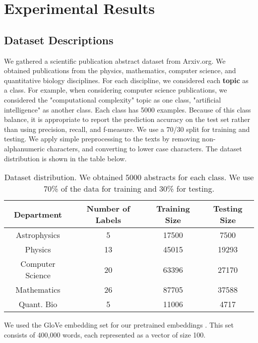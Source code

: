 
\chapter{Experimental Results} \label{Results}

\section{Dataset Descriptions}

We gathered a scientific publication abstract dataset from Arxiv.org. We obtained
publications from the physics, mathematics, computer science, and quantitative biology disciplines.
For each discipline, we considered each \textbf{topic} as a
class. For example, when considering computer science publications, we considered the
"computational complexity" topic as one class, "artificial intelligence" as another class. Each class has 5000 examples. Because of this class balance, it is appropriate to
report the prediction accuracy on the test set rather than using precision, recall, and f-measure. We use a 70/30 split for training and testing. We apply simple preprocessing to the texts by removing non-alphanumeric
characters, and converting to lower case characters. The dataset distribution is shown in the table below.

\begin{center}
  \begin{table}\begin{tabular}{||c c c c||}
 \hline
 Department & Number of Labels & Training Size & Testing Size\\ [0.5ex]
 \hline\hline
Astrophysics & 5 & 17500 & 7500\\
Physics & 13 & 45015 & 19293\\
Computer Science & 20 & 63396 & 27170 \\
Mathematics & 26 & 87705 & 37588 \\
Quant. Bio & 5 & 11006 & 4717\\
 [1ex]\hline\end{tabular}\caption{Dataset distribution. We obtained 5000 abstracts for each class. We use 70\% of the data for
 training and 30\% for testing.}\end{table}
\end{center}

We used the GloVe embedding set for our pretrained embeddings \cite{pennington2014glove}. This set consists of 400,000 words, each represented
as a vector of size 100.

